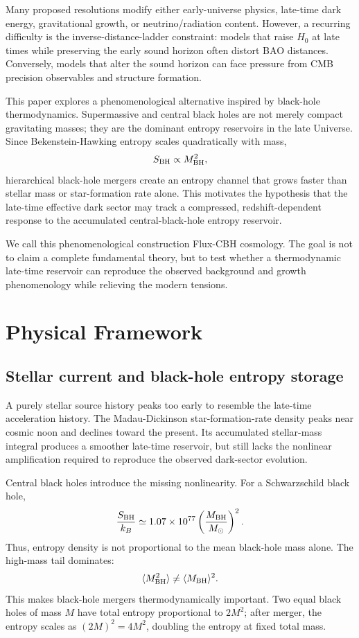 \documentclass[11pt,a4paper]{article}
\begin{document}
Many proposed resolutions modify either early-universe physics, late-time dark energy, gravitational growth, or neutrino/radiation content. However, a recurring difficulty is the inverse-distance-ladder constraint: models that raise $H_0$ at late times while preserving the early sound horizon often distort BAO distances. Conversely, models that alter the sound horizon can face pressure from CMB precision observables and structure formation.

This paper explores a phenomenological alternative inspired by black-hole thermodynamics. Supermassive and central black holes are not merely compact gravitating masses; they are the dominant entropy reservoirs in the late Universe. Since Bekenstein-Hawking entropy scales quadratically with mass,
\begin{equation}
S_{\rm BH}\propto M_{\rm BH}^2,
\end{equation}
hierarchical black-hole mergers create an entropy channel that grows faster than stellar mass or star-formation rate alone. This motivates the hypothesis that the late-time effective dark sector may track a compressed, redshift-dependent response to the accumulated central-black-hole entropy reservoir.

We call this phenomenological construction Flux-CBH cosmology. The goal is not to claim a complete fundamental theory, but to test whether a thermodynamic late-time reservoir can reproduce the observed background and growth phenomenology while relieving the modern tensions.

\section{Physical Framework}

\subsection{Stellar current and black-hole entropy storage}

A purely stellar source history peaks too early to resemble the late-time acceleration history. The Madau-Dickinson star-formation-rate density peaks near cosmic noon and declines toward the present. Its accumulated stellar-mass integral produces a smoother late-time reservoir, but still lacks the nonlinear amplification required to reproduce the observed dark-sector evolution.

Central black holes introduce the missing nonlinearity. For a Schwarzschild black hole,
\begin{equation}
\frac{S_{\rm BH}}{k_B}\simeq 1.07\times10^{77}\left(\frac{M_{\rm BH}}{M_\odot}\right)^2.
\end{equation}
Thus, entropy density is not proportional to the mean black-hole mass alone. The high-mass tail dominates:
\begin{equation}
\langle M_{\rm BH}^2\rangle \neq \langle M_{\rm BH}\rangle^2.
\end{equation}
This makes black-hole mergers thermodynamically important. Two equal black holes of mass $M$ have total entropy proportional to $2M^2$; after merger, the entropy scales as $(2M)^2=4M^2$, doubling the entropy at fixed total mass.
\end{document}
